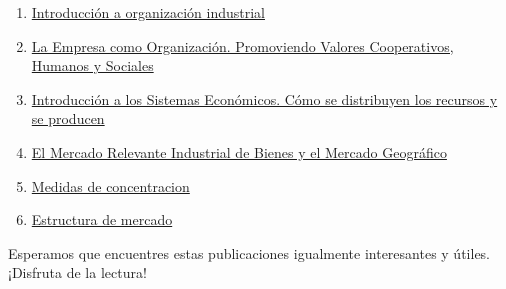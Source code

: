 \documentclass[
  a4paper,
]{article}
\begin{document}
\begin{enumerate}
\def\labelenumi{\arabic{enumi}.}
\item
  \href{../2023-06-12-introducion-organizacion-industrial-oi-cap1/index.qmd}{Introducción
  a organización industrial}
\item
  \href{../2023-06-13-empresa-como-organizacion-oi-cap1/index.qmd}{La
  Empresa como Organización. Promoviendo Valores Cooperativos, Humanos y
  Sociales}
\item
  \href{../2023-06-13-sistemas-economicos-oi.cap1/index.qmd}{Introducción
  a los Sistemas Económicos. Cómo se distribuyen los recursos y se
  producen}
\item
  \href{../2023-06-15-mercado-relevante-oi-cap2/index.qmd}{El Mercado
  Relevante Industrial de Bienes y el Mercado Geográfico}
\item
  \href{../2023-06-16-concentracion-poder-oi-cap3/index.qmd}{Medidas de
  concentracion}
\item
  \href{../2023-06-17-estructura-mercado-oi-cap4/index.qmd}{Estructura
  de mercado}
\end{enumerate}

Esperamos que encuentres estas publicaciones igualmente interesantes y
útiles. ¡Disfruta de la lectura!


\printbibliography
\end{document}
